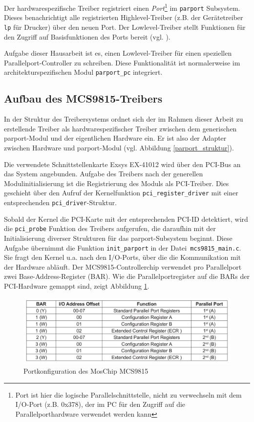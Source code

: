 \documentclass[a4paper,11pt]{article}
\begin{document}
Der hardwarespezifische Treiber registriert einen \emph{Port}\footnote{Port ist hier die logische Parallelschnittstelle, nicht zu verwechseln
mit dem I/O-Port (z.B. 0x378), der im PC für den Zugriff auf die Parallelporthardware verwendet werden kann} 
im \verb|parport| Subsystem. 
Dieses benachrichtigt alle registrierten Highlevel-Treiber (z.B. der Gerätetreiber \verb|lp| für Drucker) über den neuen Port. Der Lowlevel-Treiber stellt
Funktionen für den Zugriff auf Basisfunktionen des Ports bereit (vgl. \cite{net:1}).

Aufgabe dieser Hausarbeit ist es, einen Lowlevel-Treiber für einen speziellen Parallelport-Controller zu schreiben. Diese 
Funktionalität ist normalerweise im architekturspezifischen Modul \verb|parport_pc| integriert.

\subsection{Aufbau des MCS9815-Treibers}

In der Struktur des Treibersystems ordnet sich der im Rahmen dieser Arbeit zu erstellende Treiber als hardwarespezifischer Treiber
zwischen dem generischen parport-Modul und der eigentlichen Hardware ein. Er ist also der Adapter zwischen Hardware und parport-Modul 
(vgl. Abbildung \ref{parport_struktur}).

Die verwendete Schnittstellenkarte Exsys EX-41012 wird über den PCI-Bus an das System angebunden. Aufgabe des Treibers nach der generellen
Modulinitialisierung ist die Registrierung des Moduls als PCI-Treiber. Dies geschieht über den Aufruf der Kernelfunktion
\verb|pci_register_driver| mit einer entsprechenden \verb|pci_driver|-Struktur.

Sobald der Kernel die PCI-Karte mit der entsprechenden PCI-ID detektiert, wird die \verb|pci_probe| Funktion des Treibers aufgerufen, die
daraufhin mit der Initialisierung diverser Strukturen für das parport-Subsystem beginnt. Diese Aufgabe übernimmt die Funktion \verb|init_parport|
in der Datei\verb| mcs9815_main.c|.
Sie fragt den Kernel u.a. nach den I/O-Ports, über die die Kommunikation mit der Hardware abläuft. Der MCS9815-Controllerchip verwendet pro
Parallelport zwei Base-Address-Register (BAR). Wie die Parallelportregister auf die BARs der PCI-Hardware gemappt sind, zeigt 
Abbildung \ref{portkonf_mcs9815}.

\begin{figure}[h!]
 \centering
 \includegraphics[scale=0.5]{./pics/mcs9815_ioports.png}
 \caption{Portkonfiguration des MosChip MCS9815}
 \label{portkonf_mcs9815}
\end{figure}
\end{document}
